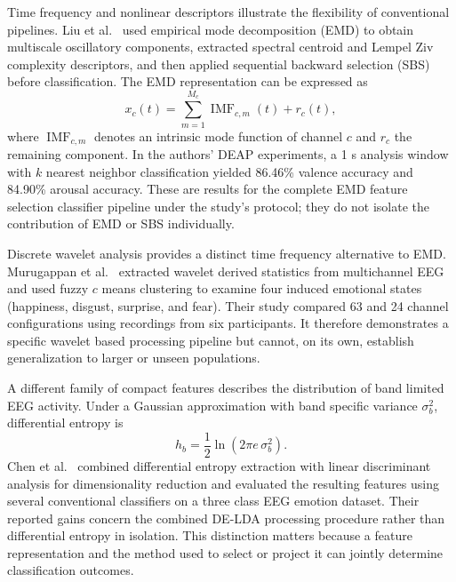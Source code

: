\documentclass[ASNA,twocolumn]{USG}
\begin{document}
Time frequency and nonlinear descriptors illustrate the flexibility of conventional pipelines. Liu et al.~\cite{liu2018electroencephalogram} used empirical mode decomposition (EMD) to obtain multiscale oscillatory components, extracted spectral centroid and Lempel Ziv complexity descriptors, and then applied sequential backward selection (SBS) before classification. The EMD representation can be expressed as
\begin{equation}
x_c(t)=\sum_{m=1}^{M_c}\operatorname{IMF}_{c,m}(t)+r_c(t),
\label{eq:eeg_shallow_emd_decomposition}
\end{equation}
where $\operatorname{IMF}_{c,m}$ denotes an intrinsic mode function of channel $c$ and $r_c$ the remaining component. In the authors' DEAP experiments, a 1 s analysis window with $k$ nearest neighbor classification yielded 86.46\% valence accuracy and 84.90\% arousal accuracy. These are results for the complete EMD feature selection classifier pipeline under the study's protocol; they do not isolate the contribution of EMD or SBS individually.

Discrete wavelet analysis provides a distinct time frequency alternative to EMD. Murugappan et al.~\cite{murugappan2008time} extracted wavelet derived statistics from multichannel EEG and used fuzzy $c$ means clustering to examine four induced emotional states (happiness, disgust, surprise, and fear). Their study compared 63  and 24 channel configurations using recordings from six participants. It therefore demonstrates a specific wavelet based processing pipeline but cannot, on its own, establish generalization to larger or unseen populations.

A different family of compact features describes the distribution of band limited EEG activity. Under a Gaussian approximation with band specific variance $\sigma_b^2$, differential entropy is
\begin{equation}
h_b=\frac{1}{2}\ln\!\left(2\pi e\,\sigma_b^2\right).
\label{eq:eeg_gaussian_differential_entropy}
\end{equation}
Chen et al.~\cite{chen2019feature} combined differential entropy extraction with linear discriminant analysis for dimensionality reduction and evaluated the resulting features using several conventional classifiers on a three class EEG emotion dataset. Their reported gains concern the combined DE-LDA processing procedure rather than differential entropy in isolation. This distinction matters because a feature representation and the method used to select or project it can jointly determine classification outcomes.
\end{document}
